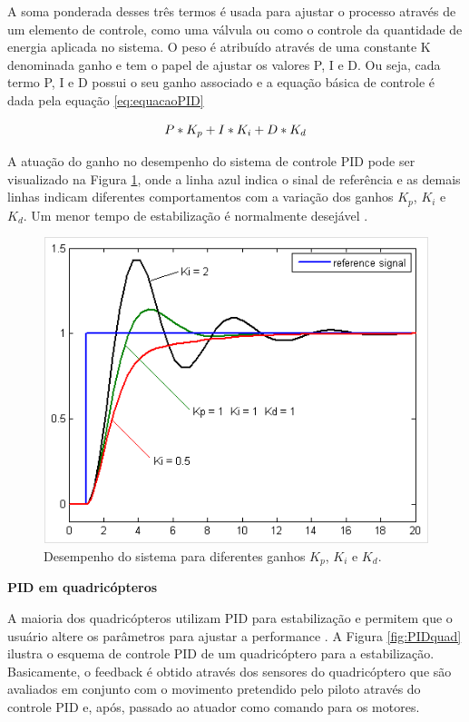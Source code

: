 \documentclass[a4paper, 12pt]{article}
\begin{document}
A soma ponderada desses três termos é usada para ajustar o processo através de um elemento de controle, como uma válvula ou como o controle da quantidade de energia aplicada no sistema. O peso é atribuído através de uma constante K denominada ganho e tem o papel de ajustar os valores P, I e D. Ou seja, cada termo P, I e D possui o seu ganho associado e a equação básica de controle é dada pela equação \ref{eq:equacaoPID}

\begin{equation}
	\centering
		P*K_p + I*K_i + D*K_d	
	\label{eq:equacaoPID}
\end{equation}

A atuação do ganho no desempenho do sistema de controle PID pode ser visualizado na Figura \ref{fig:ganhoPID}, onde a linha azul indica o sinal de referência e as demais linhas indicam diferentes comportamentos com a variação dos ganhos $K_p$, $K_i$ e $K_d$. Um menor tempo de estabilização é normalmente desejável \cite{Kingdom}.  

\begin{figure}[h]
	\centering
		\includegraphics[scale=0.5]{img/ganho_PID.png}
	\caption{Desempenho do sistema para diferentes ganhos $K_p$, $K_i$ e $K_d$.}
	\label{fig:ganhoPID}
\end{figure}
 
\noindent\textbf{PID em quadricópteros}

A maioria dos quadricópteros utilizam PID para estabilização e permitem que o usuário altere os parâmetros para ajustar a performance \cite{Liang}. A Figura \ref{fig:PIDquad} ilustra o esquema de controle PID de um quadricóptero para a estabilização. Basicamente, o feedback é obtido através dos sensores do quadricóptero que são avaliados em conjunto com o movimento pretendido pelo piloto através do controle PID e, após, passado ao atuador como comando para os motores. 
\end{document}
